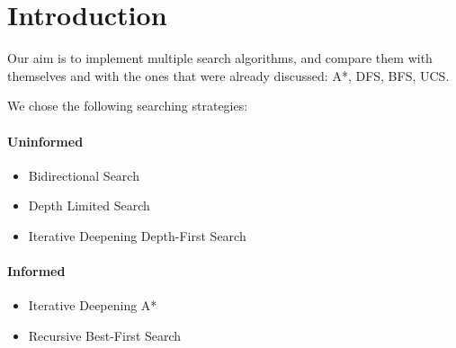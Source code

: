 \section{Introduction} 

Our aim is to implement multiple search algorithms, and compare them with themselves and with the ones that were already discussed: A*, DFS, BFS, UCS.

We chose the following searching strategies:

\paragraph{Uninformed}

\begin{itemize}

\item Bidirectional Search

\item Depth Limited Search

\item Iterative Deepening Depth-First Search

\end{itemize}

\paragraph{Informed}

\begin{itemize}

\item Iterative Deepening A*

\item Recursive Best-First Search

\end{itemize}
